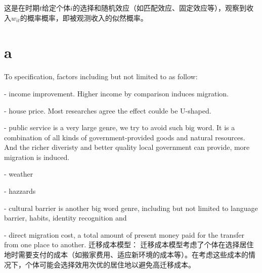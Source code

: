 \documentclass[a4paper, zihao=-4, fontset = mac, oneside]{ctexbook} %
\begin{document}
这是在时期$t$给定个体$i$的选择和随机效应（如匹配效应、固定效应等），观察到收入$w_{it}$的概率概率，即被观测收入的似然概率。


\chapter{a}


To specification, factors including but not limited to as follow:

- income improvement. Higher income by comparison induces migration. 

- house price. Most researches agree the effect coulde be U-shaped.

- public service is a very large genre, we try to avoid such big word. It is a combination of all kinds of government-provided goods and natural resources. And the richer diveristy and better quality local government can provide, more migration is induced.

- weather

- hazzards

- cultural barrier is another big word genre, including but not limited to language barrier, habits, identity recognition and 

- direct migration cost, a total amount of present money paid for the transfer from one place to another. 迁移成本模型： 迁移成本模型考虑了个体在选择居住地时需要支付的成本（如搬家费用、适应新环境的成本等）。在考虑这些成本的情况下，个体可能会选择效用次优的居住地以避免高迁移成本。


\newpage
%
%
%
\printbibliography[heading=bibliography,title=参考文献]
\end{document}
